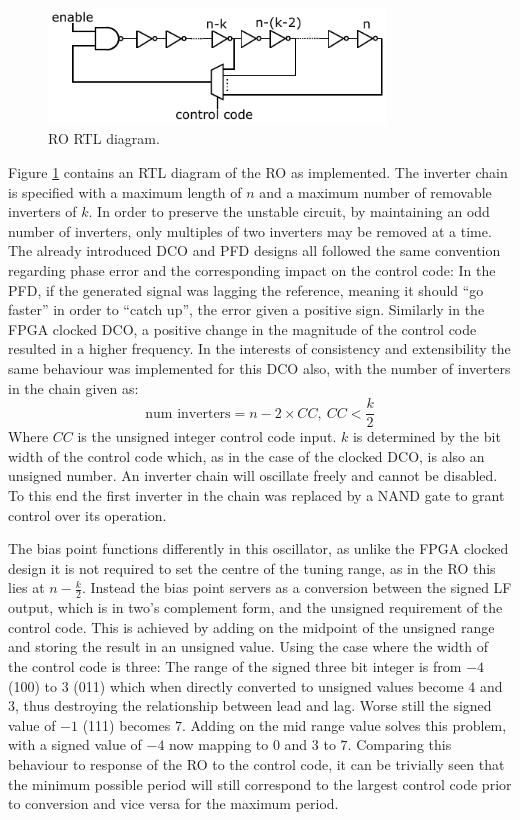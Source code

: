\begin{figure}[h]
    \centering
    \includegraphics[width=0.8\textwidth]{../ro_new}
    \caption[\acl{RO} RTL diagram]{\acl{RO} RTL diagram.}
    \label{fig:ro_impl}
\end{figure}
Figure \ref{fig:ro_impl} contains an \ac{RTL} diagram of the \ac{RO} as implemented. The inverter chain is specified with a maximum length of $n$ and a maximum number of removable inverters of $k$. In order to preserve the unstable circuit, by maintaining an odd number of inverters, only multiples of two inverters may be removed at a time. The already introduced \ac{DCO} and \ac{PFD} designs all followed the same convention regarding phase error and the corresponding impact on the control code: In the \ac{PFD}, if the generated signal was lagging the reference, meaning it should ``go faster'' in order to ``catch up'', the error given a positive sign. Similarly in the \ac{FPGA} clocked \ac{DCO}, a positive change in the magnitude of the control code resulted in a higher frequency. In the interests of consistency and extensibility the same behaviour was implemented for this \ac{DCO} also, with the number of inverters in the chain given as:
\begin{equation}
\text{num inverters} = n - 2\times CC,~CC<\frac{k}{2}
\end{equation}
Where $CC$ is the unsigned integer control code input. $k$ is determined by the bit width of the control code which, as in the case of the clocked \ac{DCO}, is also an unsigned number. An inverter chain will oscillate freely and cannot be disabled. To this end the first inverter in the chain was replaced by a \acs{NAND} gate to grant control over its operation.

The bias point functions differently in this oscillator, as unlike the \ac{FPGA} clocked design it is not required to set the centre of the tuning range, as in the \ac{RO} this lies at $n-\frac{k}{2}$. Instead the bias point servers as a conversion between the signed \ac{LF} output, which is in two's complement form, and the unsigned requirement of the control code. This is achieved by adding on the midpoint of the unsigned range and storing the result in an unsigned value. Using the case where the width of the control code is three: The range of the signed three bit integer is from $-4$ (100) to $3$ (011) which when directly converted to unsigned values become $4$ and $3$, thus destroying the relationship between lead and lag. Worse still the signed value of $-1$ (111) becomes $7$. Adding on the mid range value solves this problem, with a signed value of $-4$ now mapping to $0$ and $3$ to $7$. Comparing this behaviour to response of the \ac{RO} to the control code, it can be trivially seen that the minimum possible period will still correspond to the largest control code prior to conversion and vice versa for the maximum period.


